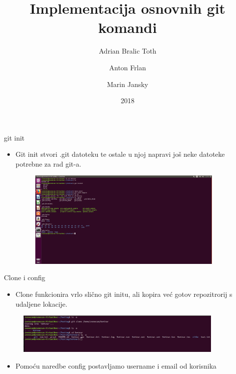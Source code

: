 \documentclass{beamer}
\title{Implementacija osnovnih git komandi}
\author{Adrian Bralic Toth \and Anton Frlan \and Marin Jansky}
\institute{Tehnički Fakultet Rijeka}
\date{2018}
\begin{document}
\frame{\titlepage}


\begin{frame}{git init}

\begin{itemize}
	\setlength\itemsep{2em}
	\item Git init stvori .git datoteku te ostale u njoj napravi još neke datoteke potrebne za rad git-a.
	\begin{figure}
\centering
\includegraphics[width=0.9\textwidth]{./slike/git_datoteka.png}
\end{figure}
\end{itemize}

\end{frame}

\begin{frame}{Clone i config}

\begin{itemize}
	\item Clone funkcionira vrlo slično git initu, ali kopira već gotov repozitrorij s udaljene lokacije.
\end{itemize}
	\begin{figure}
		\includegraphics[width=0.9\textwidth]{./slike/b.png}
	\end{figure}
\begin{itemize}
	\item Pomoću naredbe config postavljamo username i email od korisnika
\end{itemize}

\end{frame}
\end{document}
